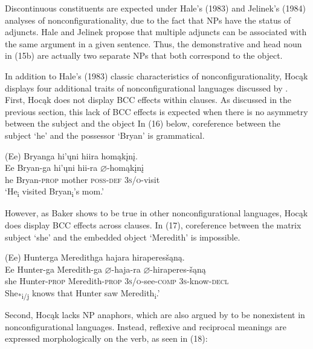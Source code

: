 \documentclass[output=paper]{LSP/langsci}
\begin{document}
Discontinuous constituents are expected under Hale's (1983) and Jelinek's (1984) analyses of nonconfigurationality, due to the fact that NPs have the status of adjuncts. Hale and Jelinek propose that multiple adjuncts can be associated with the same argument in a given sentence. Thus, the demonstrative and head noun in (15b) are actually two separate NPs that both correspond to the object.

In addition to Hale's (1983) classic characteristics of nonconfigurationality, Hocąk displays four additional traits of nonconfigurational languages discussed by \citet{Baker1996}. First, Hocąk does not display BCC effects within clauses.  As discussed in the previous section, this lack of BCC effects is expected when there is no asymmetry between the subject and the object In (16) below, coreference between the subject `he' and the possessor `Bryan' is grammatical.

\begin{exe}
\ex	
\glll (Ee) 	Bryanga 			hi'\k{u}ni 	hiira 				homąk\k{i}n\k{i}. \\
Ee 		Bryan-ga 		hi'\k{u}ni 	hii-ra 			$\varnothing$-homąk\k{i}n\k{i} \\
he 		Bryan-\textsc{prop} mother 	\textsc{poss-def} 	\textsc{3s/o}-visit  \\
\trans `He\textsubscript{i} visited Bryan\textsubscript{i}'s mom.'
\end{exe}
However, as Baker shows to be true in other nonconfigurational languages, Hocąk does display BCC effects across clauses. In (17), coreference between the matrix subject `she' and the embedded object `Meredith' is impossible.

\begin{exe}
\ex	
\glll (Ee) 	Hunterga 	Meredithga		hajara 						hiraperes\v{s}ąną. \\
 Ee 		Hunter-ga 	Meredith-ga 		$\varnothing$-haja-ra 				$\varnothing$-hiraperes-\v{s}ąną \\
she 		Hunter-\textsc{prop} 	Meredith-\textsc{prop} 	\textsc{3s/o}-see-\textsc{comp} 	\textsc{3s}-know-\textsc{decl}  \\
\trans She\textsubscript{*i/j} knows that Hunter saw Meredith\textsubscript{i}.'
\end{exe}	

Second, Hocąk lacks NP anaphors, which are also argued by \citet{Baker1996} to be nonexistent in nonconfigurational languages. Instead, reflexive and reciprocal meanings are expressed morphologically on the verb, as seen in (18):
\end{document}
